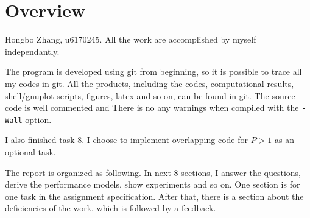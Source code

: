 \section{Overview}

Hongbo Zhang, u6170245. All the work are accomplished by myself independantly.

\vspace{\baselineskip}

The program is developed using git from beginning, so it is possible to trace
all my codes in git. All the products, including the codes, computational results,
shell/gnuplot scripts, figures, latex and so on, can be found in git. 
The source code is well commented and There is no any warnings when compiled 
with the \lstinline{-Wall} option.

I also finished task 8. I choose to implement overlapping code for $P>1$ as
an optional task.


\vspace{\baselineskip}

The report is organized as following. In next 8 sections, I answer the questions,
derive the performance models, show experiments and so on.
One section is for one task in the assignment specification. 
After that, there is a section about the deficiencies of the work,
which is followed by a feedback.

